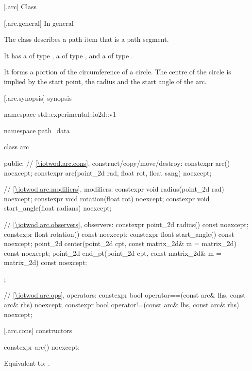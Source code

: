  [\iotwod.arc] {Class }

 [\iotwod.arc.general] {In general}

\pnum
{}%
The class  describes a path item that is a path segment.

\pnum
It has a  of type , a  of type , and a  of type .

\pnum
It forms a portion of the circumference of a circle. The centre of the circle is implied by the start point, the radius and the start angle of the arc.

 [\iotwod.arc.synopsis] { synopsis}

\begin{codeblock}
namespace std::experimental::io2d::v1 {
  namespace path_data {
    class arc {
    public:
      // \ref{\iotwod.arc.cons}, construct/copy/move/destroy:
      constexpr arc() noexcept;
      constexpr arc(point_2d rad,
        float rot, float sang) noexcept;

      // \ref{\iotwod.arc.modifiers}, modifiers:
      constexpr void radius(point_2d rad) noexcept;
      constexpr void rotation(float rot) noexcept;
      constexpr void start_angle(float radians) noexcept;

      // \ref{\iotwod.arc.observers}, observers:
      constexpr point_2d radius() const noexcept;
      constexpr float rotation() const noexcept;
      constexpr float start_angle() const noexcept;
      point_2d center(point_2d cpt, const matrix_2d& m = matrix_2d{}) 
        const noexcept;
      point_2d end_pt(point_2d cpt, const matrix_2d& m = matrix_2d{}) 
        const noexcept;
    };
    
    // \ref{\iotwod.arc.ops}, operators:
    constexpr bool operator==(const arc& lhs, const arc& rhs) noexcept;
    constexpr bool operator!=(const arc& lhs, const arc& rhs) noexcept;
  }
}
\end{codeblock}

 [\iotwod.arc.cons] { constructors}

%
\begin{itemdecl}
constexpr arc() noexcept;
\end{itemdecl}
\begin{itemdescr}
\pnum
\effects
Equivalent to: .
\end{itemdescr}

